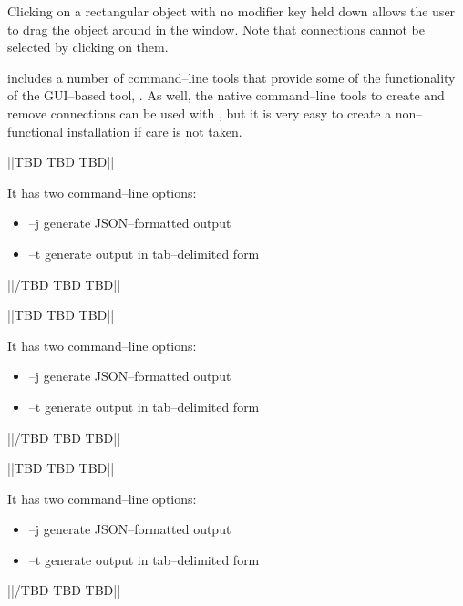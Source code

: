Clicking on a rectangular object with no modifier key held down allows the user to drag
the object around in the window.
Note that connections cannot be selected by clicking on them.


\secondaryEnd{}


\mplusm{} includes a number of command--line tools that provide some of the functionality
of the GUI--based tool, .
As well, the native \yarp{} command--line tools to create and remove connections can be
used with \mplusm{}, but it is very easy to create a non--functional installation if care
is not taken.


			||TBD TBD TBD||

It has two command--line options:
\begin{itemize}
\item --j generate JSON--formatted output
\item --t generate output in tab--delimited form
\end{itemize}
			||/TBD TBD TBD||



			||TBD TBD TBD||

It has two command--line options:
\begin{itemize}
\item --j generate JSON--formatted output
\item --t generate output in tab--delimited form
\end{itemize}
			||/TBD TBD TBD||



			||TBD TBD TBD||

It has two command--line options:
\begin{itemize}
\item --j generate JSON--formatted output
\item --t generate output in tab--delimited form
\end{itemize}
			||/TBD TBD TBD||


